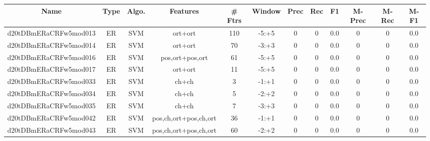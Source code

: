 \documentclass[a4paper]{article}
\begin{document}
\begin{landscape}
\begin{center}
\begin{tabular}{ |c|c|c|c|c|c|c|c|c|c|c|c|}
 \hline
\end{tabular}
\end{center}




\begin{center}
\begin{tabular}{ |c|c|c|c|c|c|c|c|c|c|c|c|} 
 \hline
 	Name & Type & Algo. & Features & \# Ftrs & Window & Prec & Rec & F1 & M-Prec & M-Rec & M-F1\\
 \hline

 	

 
 	
 	\small{ d20tDBmERaCRFw5mod013 } & ER & SVM & ort+ort  &  110 &  -5:+5  &  0 & 0 & 0.0  &  0 & 0 & 0.0 \\
 	

 
 	
 	\small{ d20tDBmERaCRFw5mod014 } & ER & SVM & ort+ort  &  70 &  -3:+3  &  0 & 0 & 0.0  &  0 & 0 & 0.0 \\
 	

 
 	
 	\small{ d20tDBmERaCRFw5mod016 } & ER & SVM & pos,ort+pos,ort  &  61 &  -5:+5  &  0 & 0 & 0.0  &  0 & 0 & 0.0 \\
 	

 
 	
 	\small{ d20tDBmERaCRFw5mod017 } & ER & SVM & ort+ort  &  11 &  -5:+5  &  0 & 0 & 0.0  &  0 & 0 & 0.0 \\
 	

 
 	
 	\small{ d20tDBmERaCRFw5mod033 } & ER & SVM & ch+ch  &  3 &  -1:+1  &  0 & 0 & 0.0  &  0 & 0 & 0.0 \\
 	

 
 	
 	\small{ d20tDBmERaCRFw5mod034 } & ER & SVM & ch+ch  &  5 &  -2:+2  &  0 & 0 & 0.0  &  0 & 0 & 0.0 \\
 	

 
 	
 	\small{ d20tDBmERaCRFw5mod035 } & ER & SVM & ch+ch  &  7 &  -3:+3  &  0 & 0 & 0.0  &  0 & 0 & 0.0 \\
 	

 
 	
 	\small{ d20tDBmERaCRFw5mod042 } & ER & SVM & pos,ch,ort+pos,ch,ort  &  36 &  -1:+1  &  0 & 0 & 0.0  &  0 & 0 & 0.0 \\
 	

 
 	
 	\small{ d20tDBmERaCRFw5mod043 } & ER & SVM & pos,ch,ort+pos,ch,ort  &  60 &  -2:+2  &  0 & 0 & 0.0  &  0 & 0 & 0.0 \\
 	


\end{tabular}
\end{center}
\end{landscape}
\end{document}
